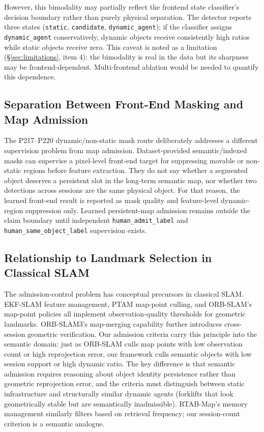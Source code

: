 \documentclass[journal]{IEEEtran}
\begin{document}
However, this bimodality may partially reflect the frontend state classifier's decision boundary rather than purely physical separation. The detector reports three states (\texttt{static}, \texttt{candidate}, \texttt{dynamic\_agent}); if the classifier assigns \texttt{dynamic\_agent} conservatively, dynamic objects receive consistently high ratios while static objects receive zero. This caveat is noted as a limitation (\S\ref{sec:limitations}, item 4): the bimodality is real in the data but its sharpness may be frontend-dependent. Multi-frontend ablation would be needed to quantify this dependence.

\subsection{Separation Between Front-End Masking and Map Admission}
\label{sec:disc_mask_admission_boundary}

The P217--P220 dynamic/non-static mask route deliberately addresses a different supervision problem from map admission. Dataset-provided semantic/indexed masks can supervise a pixel-level front-end target for suppressing movable or non-static regions before feature extraction. They do not say whether a segmented object deserves a persistent slot in the long-term semantic map, nor whether two detections across sessions are the same physical object. For that reason, the learned front-end result is reported as mask quality and feature-level dynamic-region suppression only. Learned persistent-map admission remains outside the claim boundary until independent \texttt{human\_admit\_label} and \texttt{human\_same\_object\_label} supervision exists.

\subsection{Relationship to Landmark Selection in Classical SLAM}
\label{sec:disc_landmark}

The admission-control problem has conceptual precursors in classical SLAM. EKF-SLAM feature management, PTAM map-point culling, and ORB-SLAM's map-point policies all implement observation-quality thresholds for geometric landmarks. ORB-SLAM3's map-merging capability further introduces cross-session geometric verification. Our admission criteria carry this principle into the semantic domain: just as ORB-SLAM culls map points with low observation count or high reprojection error, our framework culls semantic objects with low session support or high dynamic ratio. The key difference is that semantic admission requires reasoning about object identity persistence rather than geometric reprojection error, and the criteria must distinguish between static infrastructure and structurally similar dynamic agents (forklifts that look geometrically stable but are semantically inadmissible). RTAB-Map's memory management similarly filters based on retrieval frequency; our session-count criterion is a semantic analogue.
\end{document}

